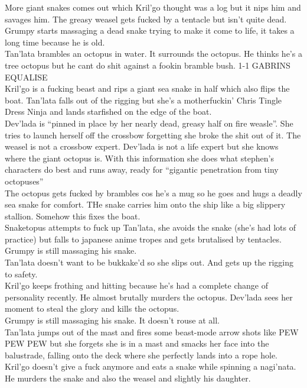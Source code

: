 More giant snakes comes out which Kril’go thought was a log but it nips him and savages him. The greasy weasel gets fucked by a tentacle but isn’t quite dead.\\
Grumpy starts massaging a dead snake trying to make it come to life, it takes a long time because he is old.\\
Tan’lata brambles an octopus in water. It surrounds the octopus. He thinks he’s a tree octopus but he cant do shit against a fookin bramble bush. 1-1 GABRINS EQUALISE\\
Kril’go is a fucking beast and rips a giant sea snake in half which also flips the boat. Tan’lata falls out of the rigging but she’s a motherfuckin’ Chris Tingle Dress Ninja and lands starfished on the edge of the boat.\\
Dev’lada is “pinned in place by her nearly dead, greasy half on fire weasle”. She tries to launch herself off the crossbow forgetting she broke the shit out of it. The weasel is not a crossbow expert. Dev’lada is not a life expert but she knows where the giant octopus is. With this information she does what stephen’s characters do best and runs away, ready for “gigantic penetration from tiny octopuses”\\
The octopus gets fucked by brambles cos he’s a mug so he goes and hugs a deadly sea snake for comfort. THe snake carries him onto the ship like a big slippery stallion. Somehow this fixes the boat.\\
Snaketopus attempts to fuck up Tan’lata, she avoids the snake (she’s had lots of practice) but falls to japanese anime tropes and gets brutalised by tentacles.\\
Grumpy is still massaging his snake.\\
Tan’lata doesn’t want to be bukkake’d so she slips out. And gets up the rigging to safety.\\
Kril’go keeps frothing and hitting because he’s had a complete change of personality recently. He almost brutally murders the octopus. Dev’lada sees her moment to steal the glory and kills the octopus.\\
Grumpy is still massaging his snake. It doesn’t rouse at all.\\
Tan’lata jumps out of the mast and fires some beast-mode arrow shots like PEW PEW PEW but she forgets she is in a mast and smacks her face into the balustrade, falling onto the deck where she perfectly lands into a rope hole.\\
Kril’go doesn’t give a fuck anymore and eats a snake while spinning a nagi’nata. He murders the snake and also the weasel and slightly his daughter.\\
